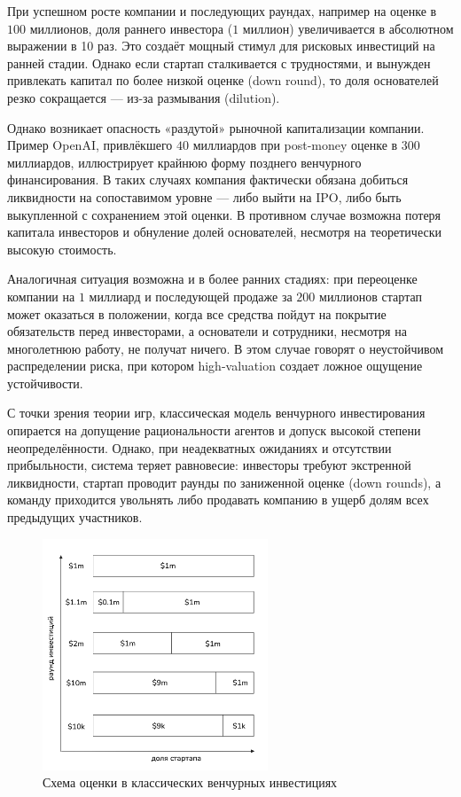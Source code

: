 \documentclass[
    14pt,
    specialist,
    candidate, %
    subf, %
    href,
    dotsinheaders=false
]{disser}
\begin{document}
При успешном росте компании и последующих раундах, например на оценке в $100$ миллионов, доля раннего инвестора ($1$ миллион) увеличивается в абсолютном выражении в 10 раз. Это создаёт мощный стимул для рисковых инвестиций на ранней стадии. Однако если стартап сталкивается с трудностями, и вынужден привлекать капитал по более низкой оценке (down round), то доля основателей резко сокращается — из-за размывания (dilution).

Однако возникает опасность «раздутой» рыночной капитализации компании. Пример OpenAI, привлёкшего $40$ миллиардов при post-money оценке в $300$ миллиардов, иллюстрирует крайнюю форму позднего венчурного финансирования. В таких случаях компания фактически обязана добиться ликвидности на сопоставимом уровне — либо выйти на IPO, либо быть выкупленной с сохранением этой оценки. В противном случае возможна потеря капитала инвесторов и обнуление долей основателей, несмотря на теоретически высокую стоимость. \cite{}

Аналогичная ситуация возможна и в более ранних стадиях: при переоценке компании на $1$ миллиард и последующей продаже за $200$ миллионов стартап может оказаться в положении, когда все средства пойдут на покрытие обязательств перед инвесторами, а основатели и сотрудники, несмотря на многолетнюю работу, не получат ничего. В этом случае говорят о неустойчивом распределении риска, при котором high-valuation создает ложное ощущение устойчивости.

С точки зрения теории игр, классическая модель венчурного инвестирования опирается на допущение рациональности агентов и допуск высокой степени неопределённости. Однако, при неадекватных ожиданиях и отсутствии прибыльности, система теряет равновесие: инвесторы требуют экстренной ликвидности, стартап проводит раунды по заниженной оценке (down rounds), а команду приходится увольнять либо продавать компанию в ущерб долям всех предыдущих участников.

\begin{figure}[H]
  \centering
  \includegraphics[width=0.6\textwidth]{./assets/investments.png}
  \caption{Схема оценки в классических венчурных инвестициях}
  \label{fig:investments}
\end{figure}
\end{document}
